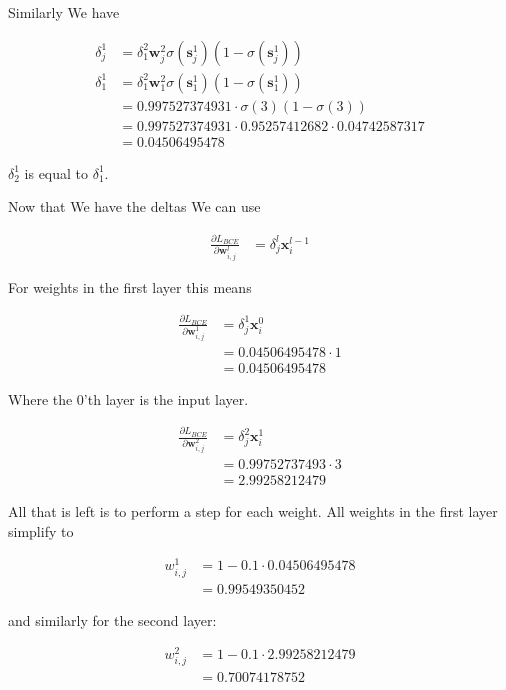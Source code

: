 \documentclass{article}
\begin{document}
	 Similarly We have
	 
	 \begin{align}
	 	\delta^1_j &=   \delta^2_1 \mathbf{w}^2_j \sigma(\mathbf{s}^{1}_j)(1-\sigma(\mathbf{s}^{1}_j))\\
	 	\delta^1_1 &=   \delta^2_1 \mathbf{w}^2_1 \sigma(\mathbf{s}^{1}_1)(1-\sigma(\mathbf{s}^{1}_1))\\
	 	&=   0.997527374931\cdot  \sigma(3)(1-\sigma(3))\\
	 	&=   0.997527374931\cdot  0.95257412682 \cdot 0.04742587317\\
	 	&= 0.04506495478
	 \end{align}
	 
	 $\delta^1_2$ is equal to $\delta^1_1$. 
	 
	 Now that We have the deltas We can use

	\begin{align}
	 	\frac{\partial L_{BCE}}{\partial \mathbf{w}^l_{i, j}} &= \delta^l_j\mathbf{x}^{l-1}_i
	 \end{align}
	 
	 For weights in the first layer this means

	\begin{align}
	 	\frac{\partial L_{BCE}}{\partial \mathbf{w}^1_{i, j}} &= \delta^1_j\mathbf{x}^{0}_i\\
	 	&= 0.04506495478\cdot 1\\
	 	&= 0.04506495478
	 \end{align}
	 
	 Where the 0'th layer is the input layer. 

	\begin{align}
	 	\frac{\partial L_{BCE}}{\partial \mathbf{w}^2_{i, j}} &= \delta^2_j\mathbf{x}^{1}_i\\
	 	&= 0.99752737493\cdot 3\\
	 	&= 2.99258212479
	 \end{align}
	 
	 All that is left is to perform a step for each weight. All weights in the first layer simplify to 
	 
	 \begin{align}
	 	w^1_{i, j} &= 1 - 0.1\cdot 0.04506495478\\
	 	&= 0.99549350452
	 \end{align}
	 
	 and similarly for the second layer:
	 
	  \begin{align}
	 	w^2_{i, j} &= 1 - 0.1\cdot 2.99258212479\\
	 	&= 0.70074178752
	 \end{align}
	 
\end{document}

